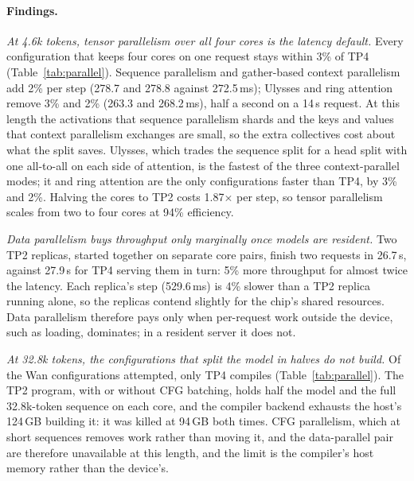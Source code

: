 \paragraph{Findings.}
\emph{At 4.6k tokens, tensor parallelism over all four cores is the latency default.} Every configuration that keeps four cores on one request stays within 3\% of TP4 (Table~\ref{tab:parallel}). Sequence parallelism and gather-based context parallelism add 2\% per step (278.7 and 278.8 against 272.5\,ms); Ulysses and ring attention remove 3\% and 2\% (263.3 and 268.2\,ms), half a second on a 14\,s request. At this length the activations that sequence parallelism shards and the keys and values that context parallelism exchanges are small, so the extra collectives cost about what the split saves. Ulysses, which trades the sequence split for a head split with one all-to-all on each side of attention, is the fastest of the three context-parallel modes; it and ring attention are the only configurations faster than TP4, by 3\% and 2\%. Halving the cores to TP2 costs 1.87$\times$ per step, so tensor parallelism scales from two to four cores at 94\% efficiency.

\emph{Data parallelism buys throughput only marginally once models are resident.} Two TP2 replicas, started together on separate core pairs, finish two requests in 26.7\,s, against 27.9\,s for TP4 serving them in turn: 5\% more throughput for almost twice the latency. Each replica's step (529.6\,ms) is 4\% slower than a TP2 replica running alone, so the replicas contend slightly for the chip's shared resources. Data parallelism therefore pays only when per-request work outside the device, such as loading, dominates; in a resident server it does not.

\emph{At 32.8k tokens, the configurations that split the model in halves do not build.} Of the Wan configurations attempted, only TP4 compiles (Table~\ref{tab:parallel}). The TP2 program, with or without CFG batching, holds half the model and the full 32.8k-token sequence on each core, and the compiler backend exhausts the host's 124\,GB building it: it was killed at 94\,GB both times. CFG parallelism, which at short sequences removes work rather than moving it, and the data-parallel pair are therefore unavailable at this length, and the limit is the compiler's host memory rather than the device's.


